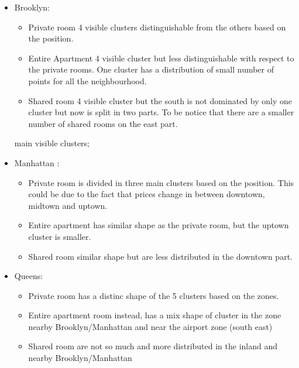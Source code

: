 \documentclass{FR16}
\begin{document}
\begin{itemize}
\itemsep0em 
\item Brooklyn: 
\begin{itemize}
\itemsep0em 
\item Private room 4 visible clusters distinguishable from the others based on the position.
\item Entire Apartment 4 visible cluster but less distinguishable with respect to the private rooms. One cluster has a distribution of small number of points for all the neighbourhood.
\item Shared room 4 visible cluster but the south is not dominated by only one cluster but now is split in two parts. To be notice that there are a smaller number of shared rooms on the east part.
\end{itemize} main visible clusters;
\item Manhattan :
\begin{itemize}
\itemsep0em 
\item Private room is divided in three main clusters based on the position. This could be due to the fact that prices change in between downtown, midtown and uptown.
\item Entire apartment has similar shape as the private room, but the uptown cluster is smaller.
\item Shared room similar shape but are less distributed in the downtown part. 
\end{itemize}

\item Queens:
\begin{itemize}
\itemsep0em 
\item Private room has a distinc shape of the 5 clusters based on the zones. 
\item Entire apartment room instead, has a mix shape of cluster in the zone nearby Brooklyn/Manhattan and near the airport zone (south east) 
\item Shared room are not so much and more distributed in the inland and nearby Brooklyn/Manhattan 
\end{itemize}



\end{itemize}
\end{document}
